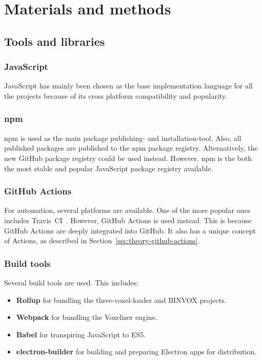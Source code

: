 \chapter[Method]{Materials and methods}



\section{Tools and libraries}
\subsection{JavaScript}
JavaScript has mainly been chosen as the base implementation language for all the projects because of its cross platform compatibility and popularity.

\subsection{npm}
npm is used as the main package publishing- and installation-tool. Also, all published packages are published to the npm package registry. Alternatively, the new GitHub package registry could be used instead. However, npm is the both the most stable and popular JavaScript package registry available.

\subsection{GitHub Actions}
For automation, several platforms are available. One of the more popular ones includes Travis~CI~\cite{travis-ci}. However, GitHub Actions is used instead. This is because GitHub Actions are deeply integrated into GitHub. It also has a unique concept of Actions, as described in Section~\ref{sec:theory-github-actions}.

\subsection{Build tools}
Several build tools are used. This includes:
\begin{itemize}
    \item \textbf{Rollup} for bundling the three-voxel-loader and BINVOX projects.
    \item \textbf{Webpack} for bundling the Voxelizer engine.
    \item \textbf{Babel} for transpiring JavaScript to ES5.
    \item \textbf{electron-builder} for building and preparing Electron apps for distribution.
\end{itemize}

